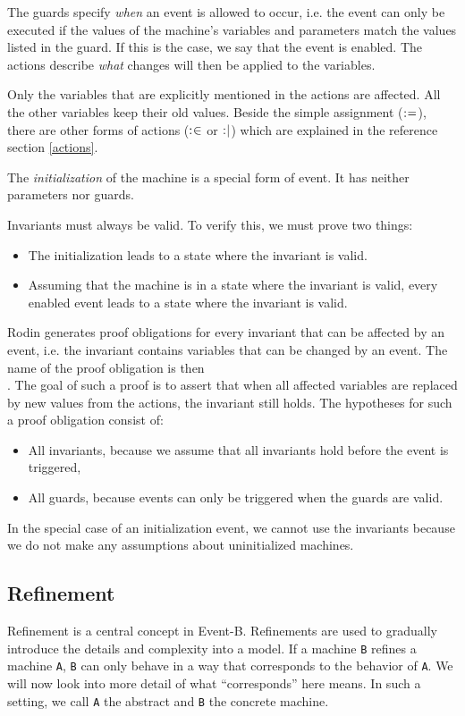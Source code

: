The guards specify \emph{when} an event is allowed to occur, i.e. the event can only be executed if the values of the machine's variables and parameters match the values listed in the guard. If this is the case, we say that the event is enabled.
The actions describe \emph{what} changes will then be applied to the variables.

Only the variables that are explicitly mentioned in the actions are affected.
All the other variables keep their old values. Beside the simple assignment ($\mathrel{:\mkern1mu=}$),
there are other forms of actions ($\mathrel{:\mkern1mu\in}$ or $\mathrel{:\mkern1mu\mid}$) which are explained in
the reference section \ref{actions}.

The \emph{initialization} of the machine is a special form of event. It has neither parameters
nor guards.

Invariants must always be valid. To verify this, we must prove two things:
\begin{itemize}
  \item The initialization leads to a state where the invariant is valid.
  \item Assuming that the machine is in a state where the invariant is valid,
    every enabled event leads to a state where the invariant is valid.
\end{itemize}

Rodin generates proof obligations for every invariant that can be affected by an event, i.e. the invariant contains variables that can be changed by an event.
The name of the proof obligation is then \\ .
The goal of such a proof is to assert that when all affected variables are replaced by new values from the actions, the invariant still holds. The hypotheses for such a proof obligation consist of:

\begin{itemize}

\item All invariants, because we assume that all invariants hold before the event is triggered,
\item All guards, because events can only be triggered when the guards are valid.
\end{itemize}

In the special case of an initialization event, we cannot use the invariants because we do not make any assumptions about uninitialized machines.

\subsection{Refinement}
\label{tut_refinement}
Refinement is a central concept in Event-B. Refinements are used to gradually
introduce the details and complexity into a model.
If a machine \texttt{B} refines a machine \texttt{A}, \texttt{B} can only behave in a way that
corresponds to the behavior of \texttt{A}. We will now look into more detail of what ``corresponds''
here means.
In such a setting, we call \texttt{A} the abstract and \texttt{B} the concrete machine.

